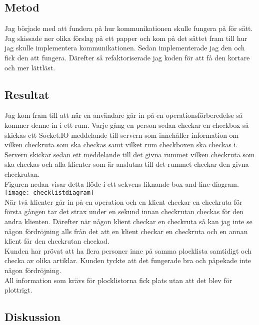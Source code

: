  
\subsection{Metod}
Jag började med att fundera på hur kommunikationen skulle fungera på för sätt. Jag skissade ner olika förslag på ett papper och kom på det sättet fram till hur jag skulle implementera kommunikationen. Sedan implementerade jag den och fick den att fungera. Därefter så refaktoriserade jag koden för att få den kortare och mer lättläst.

\subsection{Resultat}
Jag kom fram till att när en användare går in på en operationsförberedelse så kommer denne in i ett rum. Varje gång en person sedan checkar en checkbox så skickas ett Socket.IO meddelande till servern som innehåller information om vilken checkruta som ska checkas samt vilket rum checkboxen ska checkas i. Servern skickar sedan ett meddelande till det givna rummet vilken checkruta som ska checkas och alla klienter som är anslutna till det rummet checkar den givna checkrutan. \\

Figuren nedan visar detta flöde i ett sekvens liknande box-and-line-diagram.
\texttt{[image: checklistdiagram]}\\

När två klienter går in på en operation och en klient checkar en checkruta för första gången tar det strax under en sekund innan checkrutan checkas för den andra klienten. Därefter när någon klient checkar en checkruta så kan jag inte se någon fördröjning alls från det att en klient checkar en checkruta och en annan klient får den checkrutan checkad.\\

Kunden har prövat att ha flera personer inne på samma plocklista samtidigt och checka av olika artiklar. Kunden tyckte att det fungerade bra och påpekade inte någon fördröjning. \\

All information som krävs för plocklistorna fick plats utan att det blev för plottrigt.

\subsection{Diskussion}
